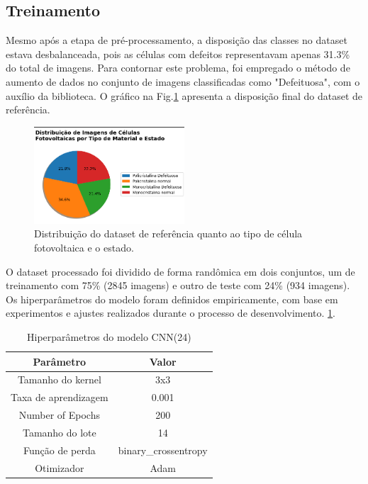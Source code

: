 \documentclass[conference]{IEEEtran}
\begin{document}
\subsection{Treinamento}\label{AA}

Mesmo após a etapa de pré-processamento, a disposição das classes no dataset
estava desbalanceada, pois as células com defeitos representavam apenas
31.3\% do total de imagens. Para contornar este problema, foi empregado
o método de aumento de dados no conjunto de imagens classificadas como
"Defeituosa", com o auxílio da biblioteca. O gráfico na
Fig.\ref{fig:dataset-overview} apresenta a disposição final do dataset de
referência.

\begin{figure}[htbp]

    \centerline{\includegraphics[width=0.5\textwidth]{images/dataset-overview.png}}
    \caption{Distribuição do dataset de referência quanto ao tipo de célula
        fotovoltaica e o estado.}
    \label{fig:dataset-overview}
\end{figure}

O dataset processado foi dividido de forma randômica em dois conjuntos, um de
treinamento
com 75\% (2845 imagens) e outro de teste com 24\% (934 imagens). Os
hiperparâmetros do modelo foram definidos empiricamente, com base em
experimentos e ajustes realizados durante o processo de desenvolvimento.
\ref{tab:hiperparametros}.

\begin{table}[h!]
    \caption{Hiperparâmetros do modelo CNN(24)}
    \centering
    \begin{tabular}{|c|c|}
        \hline
        \textbf{Parâmetro}   & \textbf{Valor}       \\ \hline
        Tamanho do kernel    & 3x3                  \\ \hline
        Taxa de aprendizagem & 0.001                \\ \hline
        Number of Epochs     & 200                  \\ \hline
        Tamanho do lote      & 14                   \\ \hline
        Função de perda      & binary\_crossentropy \\ \hline
        Otimizador           & Adam                 \\ \hline
    \end{tabular}
    \label{tab:hiperparametros}
\end{table}
\end{document}
